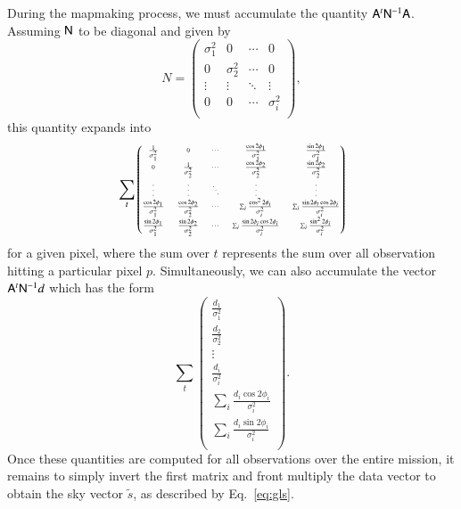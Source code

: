\documentclass{aa}
\newcommand{\A}[0]{\tens{A}}
\newcommand{\N}[0]{\tens{N}}
\begin{document}
During the mapmaking process, we must accumulate the quantity $\A^t\N^{-1}\A$. Assuming $\N$ to be diagonal and given by
\begin{equation}
N = \begin{pmatrix}
\sigma^2_1 & 0 & \cdots & 0 \\
0 & \sigma^2_2 & \cdots & 0 \\
\vdots & \vdots & \ddots & \vdots \\
0 & 0 & \cdots & \sigma^2_i \\
\end{pmatrix},
\end{equation}
this quantity expands into
\begin{equation}
\begin{tiny}
\sum_t
\begin{pmatrix}
\frac{1}{\sigma_1^2} & 0 & \cdots &
\frac{\cos2\phi_1}{\sigma_1^2} & \frac{\sin2\phi_1}{\sigma_1^2} \\

0 & \frac{1}{\sigma_2^2} & \cdots &
\frac{\cos2\phi_2}{\sigma_2^2} & \frac{\sin2\phi_2}{\sigma_2^2} \\

\vdots & \vdots & \ddots & \vdots & \vdots \\

\frac{\cos2\phi_1 }{\sigma_1^2} & \frac{\cos2\phi_2}{\sigma_2^2} & \cdots & 
\sum_{i} \frac{\cos^2 2\phi_i}{\sigma_i^2} & \sum_{i} \frac{\sin2\phi_t \cos2\phi_i}{\sigma_i^2}  \\

\frac{\sin2\phi_1}{\sigma_1^2} & \frac{\sin2\phi_2}{\sigma_2^2} & \cdots &
\sum_{i} \frac{\sin2\phi_i \cos2\phi_i}{\sigma_i^2}  & \sum_{i} \frac{ \sin^2 2\phi_i}{\sigma_i^2}
\\
\end{pmatrix}
\end{tiny}
\end{equation}
for a given pixel, where the sum over $t$ represents the sum over all observation hitting a particular pixel $p$. Simultaneously, we can also accumulate the vector $\A^t\N^{-1}d$ which has the form
\begin{equation}
\sum_t
\begin{pmatrix}
\frac{d_{1}}{\sigma_1^2} \\
\frac{d_{2}}{\sigma_2^2}\\
\vdots\\
\frac{d_{i}}{\sigma_i^2}\\
\sum_i \frac{d_{i}\cos2\phi_i}{\sigma_i^2}\\
\sum_i \frac{d_{i}\sin2\phi_i}{\sigma_i^2}\\
\end{pmatrix}.
\end{equation}
Once these quantities are computed for all observations over the entire mission, it remains to simply invert the first matrix and front multiply the data vector to obtain the sky vector $\tilde{s}$, as described by Eq.~\ref{eq:gls}.
\end{document}
